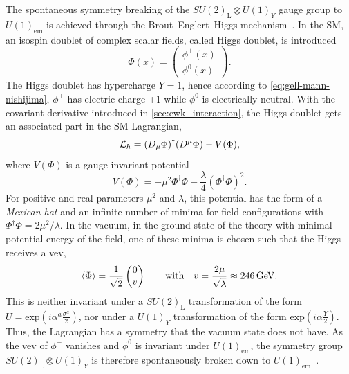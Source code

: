 The spontaneous symmetry breaking of the $SU(2)_\mathrm{L}\otimes U(1)_Y$ gauge group to $U(1)_\mathrm{em}$ is achieved through the Brout--Englert--Higgs   mechanism~\cite{PhysRevLett.13.321,PhysRevLett.13.508,PhysRev.145.1156}. In the SM, an isospin doublet of complex scalar fields, called Higgs doublet, is introduced
\begin{equation}
	\Phi(x) = \begin{pmatrix}
		\phi^+(x) \\
		\phi^0(x)
	\end{pmatrix}.
\end{equation}
The Higgs doublet has hypercharge $Y=1$, hence according to \cref{eq:gell-mann-nishijima}, $\phi^+$ has electric charge +1 while $\phi^0$ is electrically neutral. With the covariant derivative introduced in \cref{sec:ewk_interaction}, the Higgs doublet gets an associated part in the SM Lagrangian, 
\begin{equation}
	\mathcal{L}_h = (\mathop{}\!D_\mu\Phi)^\dagger(\mathop{}\!D^\mu\Phi) - V(\Phi),
	\label{eq:higgs_lagrangian}
\end{equation}
where $V(\Phi)$ is a gauge invariant potential
\begin{equation}
	V(\Phi) = -\mu^2\Phi^\dagger\Phi + \frac{\lambda}{4}(\Phi^\dagger\Phi)^2.
	\label{eq:higgs_potential}
\end{equation}
For positive and real parameters $\mu^2$ and $\lambda$, this potential has the form of a \textit{Mexican hat} and an infinite number of minima for field configurations with $\Phi^\dagger\Phi=2\mu^2/\lambda$. In the vacuum, \ie in the ground state of the theory with minimal potential energy of the field, one of these minima is chosen such that the Higgs  receives a \gls{vev},
\begin{equation}
	\braket{\Phi} = \frac{1}{\sqrt{2}}\begin{pmatrix}
		0 \\
		v
	\end{pmatrix} \qquad \textrm{with} \quad v = \frac{2\mu}{\sqrt{\lambda}} \approx \SI{246}{\GeV}.
	\label{eq:higgs_vev}
\end{equation}
This is neither invariant under a $SU(2)_\mathrm{L}$ transformation of the form $U = \mathrm{exp}(i\alpha^a\frac{\sigma^a}{2})$, nor under a $U(1)_Y$ transformation of the form $\mathrm{exp}(i\alpha\frac{Y}{2})$. Thus, the Lagrangian has a symmetry that the vacuum state does not have. As the \gls{vev} of $\phi^+$ vanishes and $\phi^0$ is invariant under $U(1)_\mathrm{em}$, the symmetry group $SU(2)_\mathrm{L}\otimes U(1)_Y$ is therefore spontaneously broken down to $U(1)_\mathrm{em}$~\cite{Brock:1354959}.

